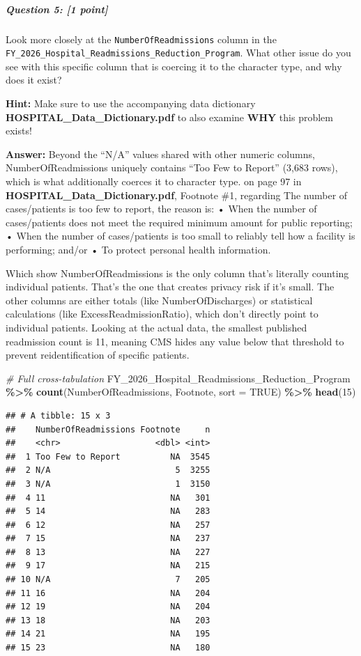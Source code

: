 \documentclass[
]{article}
\newenvironment{Shaded}{\begin{snugshade}}{\end{snugshade}}
\newcommand{\AttributeTok}[1]{\textcolor[rgb]{0.13,0.29,0.53}{#1}}
\newcommand{\CommentTok}[1]{\textcolor[rgb]{0.56,0.35,0.01}{\textit{#1}}}
\newcommand{\ConstantTok}[1]{\textcolor[rgb]{0.56,0.35,0.01}{#1}}
\newcommand{\DecValTok}[1]{\textcolor[rgb]{0.00,0.00,0.81}{#1}}
\newcommand{\FunctionTok}[1]{\textcolor[rgb]{0.13,0.29,0.53}{\textbf{#1}}}
\newcommand{\NormalTok}[1]{#1}
\newcommand{\SpecialCharTok}[1]{\textcolor[rgb]{0.81,0.36,0.00}{\textbf{#1}}}
\begin{document}
\subparagraph{\texorpdfstring{\textbf{Question 5}: {[}1
point{]}}{Question 5: {[}1 point{]}}}\label{question-5-1-point}

Look more closely at the \texttt{NumberOfReadmissions} column in the
\texttt{FY\_2026\_Hospital\_Readmissions\_Reduction\_Program}. What
other issue do you see with this specific column that is coercing it to
the character type, and why does it exist?

\textbf{Hint: } Make sure to use the accompanying data dictionary
\textbf{HOSPITAL\_Data\_Dictionary.pdf} to also examine \textbf{WHY}
this problem exists!

\textbf{Answer:} Beyond the ``N/A'' values shared with other numeric
columns, NumberOfReadmissions uniquely contains ``Too Few to Report''
(3,683 rows), which is what additionally coerces it to character type.
on page 97 in \textbf{HOSPITAL\_Data\_Dictionary.pdf}, Footnote \#1,
regarding The number of cases/patients is too few to report, the reason
is: • When the number of cases/patients does not meet the required
minimum amount for public reporting; • When the number of cases/patients
is too small to reliably tell how a facility is performing; and/or • To
protect personal health information.

Which show NumberOfReadmissions is the only column that's literally
counting individual patients. That's the one that creates privacy risk
if it's small. The other columns are either totals (like
NumberOfDischarges) or statistical calculations (like
ExcessReadmissionRatio), which don't directly point to individual
patients. Looking at the actual data, the smallest published readmission
count is 11, meaning CMS hides any value below that threshold to prevent
reidentification of specific patients.

\begin{Shaded}
\begin{Highlighting}[]
\CommentTok{\# Full cross{-}tabulation}
\NormalTok{FY\_2026\_Hospital\_Readmissions\_Reduction\_Program }\SpecialCharTok{\%\textgreater{}\%}
    \FunctionTok{count}\NormalTok{(NumberOfReadmissions, Footnote, }\AttributeTok{sort =} \ConstantTok{TRUE}\NormalTok{) }\SpecialCharTok{\%\textgreater{}\%}
    \FunctionTok{head}\NormalTok{(}\DecValTok{15}\NormalTok{)}
\end{Highlighting}
\end{Shaded}

\begin{verbatim}
## # A tibble: 15 x 3
##    NumberOfReadmissions Footnote     n
##    <chr>                   <dbl> <int>
##  1 Too Few to Report          NA  3545
##  2 N/A                         5  3255
##  3 N/A                         1  3150
##  4 11                         NA   301
##  5 14                         NA   283
##  6 12                         NA   257
##  7 15                         NA   237
##  8 13                         NA   227
##  9 17                         NA   215
## 10 N/A                         7   205
## 11 16                         NA   204
## 12 19                         NA   204
## 13 18                         NA   203
## 14 21                         NA   195
## 15 23                         NA   180
\end{verbatim}
\end{document}
